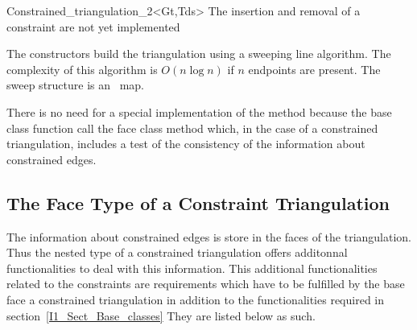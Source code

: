 \begin{ccClassTemplate} {Constrained_triangulation_2<Gt,Tds>}
\ccModifiers
The insertion and removal of a constraint
are not yet implemented



The constructors build the triangulation using a sweeping line
algorithm. The complexity of this algorithm is $O(n\log n)$ if $n$
endpoints are present. The sweep structure is an \stl\ map.

There is no need for a special implementation
of the method \ccVar{}
because the base class function
call the face class method
which, in the case of a constrained triangulation,
includes a test of the consistency of the
information about constrained edges.
\end{ccClassTemplate}

\subsection{The Face Type of a Constraint Triangulation}
 The information about constrained edges is store in the 
faces of the triangulation. Thus the nested 
type of a constrained triangulation offers
additonnal functionalities to deal with this information.
This additional functionalities related to the constraints
are requirements which have to be fulfilled
by the base face  a constrained triangulation
in addition to the functionalities required in section~\ref{I1_Sect_Base_classes}
They are listed below as such.

